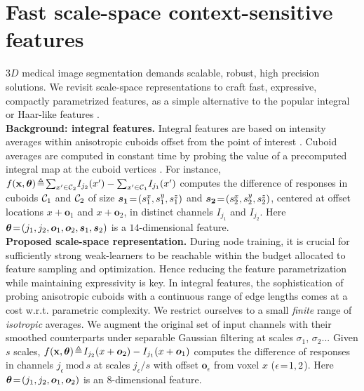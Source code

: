 \section{Fast scale-space context-sensitive features}
\label{sec: features}

$3D$ medical image segmentation demands scalable, robust, high precision solutions. We revisit scale-space representations to craft fast, expressive, compactly parametrized features, as a simple alternative to the popular integral or Haar-like features \cite{viola2001rapid}.\\

\noindent
\textbf{Background: integral features.} Integral features are based on intensity averages within anisotropic cuboids offset from the point of interest \cite{criminisi2013regression}. Cuboid averages are computed in constant time by probing the value of a precomputed integral map at the cuboid vertices \cite{viola2001rapid}. For instance, $f(\boldsymbol{\mathrm{x}}, \bm{\theta})\!\triangleq\!\sum_{x'\in\mathcal{C}_2}\!I_{j_2}(x') - \sum_{x'\in\mathcal{C}_1}\!I_{j_1}(x')$ computes the difference of responses in cuboids $\mathcal{C}_1$ and $\mathcal{C}_2$ of size $\bm{s_1}\!=\!(s_1^x,s_1^y,s_1^z)$ and $\bm{s_2}\!=\!(s_2^x,s_2^y,s_2^z)$, centered at offset locations $x+\bm{o}_1$ and $x+\bm{o}_2$, in distinct channels $I_{j_1}$ and $I_{j_2}$. Here $\bm{\theta}\!=\!(j_1,j_2,\bm{o}_1,\bm{o}_2,\bm{s}_1,\bm{s}_2)$ is a $14$-dimensional feature.\\

\noindent
\textbf{Proposed scale-space representation.} During node training, it is crucial for sufficiently strong weak-learners to be reachable within the budget allocated to feature sampling and optimization. Hence reducing the feature parametrization while maintaining expressivity is key. In integral features, the sophistication of probing anisotropic cuboids with a continuous range of edge lengths comes at a cost w.r.t. parametric complexity. We restrict ourselves to a small \textit{finite} range of \textit{isotropic} averages. We augment the original set of input channels with their smoothed counterparts under separable Gaussian filtering at scales $\sigma_1$, $\sigma_2$... Given $s$ scales, $f(\boldsymbol{\mathrm{x}}, \bm{\theta})\!\triangleq\!I_{j_2}(x+\bm{o}_2) - I_{j_1}(x+\bm{o}_1)$ computes the difference of responses in channels $j_\epsilon\,\text{mod}\,s$ at scales $j_\epsilon / s$ with offset $\bm{o}_\epsilon$ from voxel $x$ ($\epsilon\!=\!1,2$). Here $\bm{\theta}\!=\!(j_1,j_2,\bm{o}_1,\bm{o}_2)$ is an $8$-dimensional feature. 

